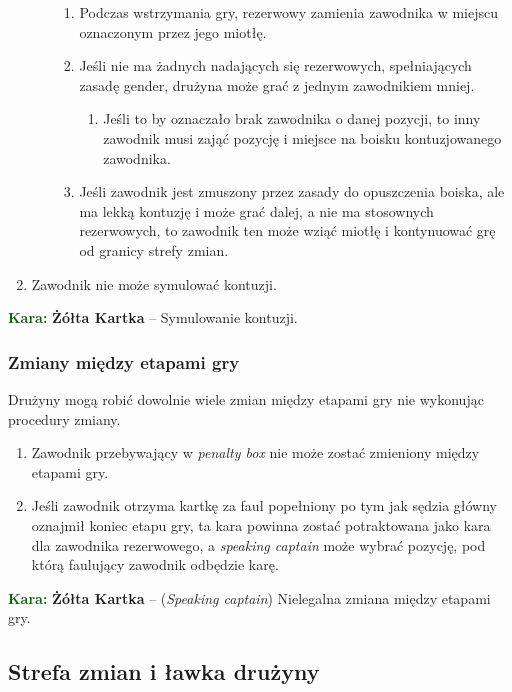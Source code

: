\documentclass[11pt,a4paper]{article}
\newcommand\yellowcard[1]{\bgroup\textcolor{darkgreen}{\textbf{Kara: }}\bgroup\textcolor{darkyellow}{\textbf{Żółta Kartka}} -- #1}
\begin{document}
\begin{enumerate}
\begin{enumerate}
\begin{enumerate}
      \item Podczas wstrzymania gry, rezerwowy zamienia zawodnika w miejscu oznaczonym przez jego miotłę.
      \item Jeśli nie ma żadnych nadających się rezerwowych, spełniających zasadę gender, drużyna może grać z jednym zawodnikiem mniej.
      \begin{enumerate}
        \item Jeśli to by oznaczało brak zawodnika o danej pozycji, to inny zawodnik musi zająć pozycję i miejsce na boisku kontuzjowanego zawodnika.
      \end{enumerate}
      \item Jeśli zawodnik jest zmuszony przez zasady do opuszczenia boiska, ale ma lekką kontuzję i może grać dalej, a nie ma stosownych rezerwowych, to zawodnik ten może wziąć miotłę i kontynuować grę od granicy strefy zmian.
    \end{enumerate}
  \end{enumerate}
  \item Zawodnik nie może symulować kontuzji.
\end{enumerate}

\yellowcard{Symulowanie kontuzji.}

\subsubsection{Zmiany między etapami gry}
Drużyny mogą robić dowolnie wiele zmian między etapami gry nie wykonując procedury zmiany.
\begin{enumerate}
  \item Zawodnik przebywający w \emph{penalty box} nie może zostać zmieniony między etapami gry.
  \item Jeśli zawodnik otrzyma kartkę za faul popełniony po tym jak sędzia główny oznajmił koniec etapu gry, ta kara powinna zostać potraktowana jako kara dla zawodnika rezerwowego, a \emph{speaking captain} może wybrać pozycję, pod którą faulujący zawodnik odbędzie karę.
\end{enumerate}

\yellowcard{(\emph{Speaking captain}) Nielegalna zmiana między etapami gry.}

\subsection{Strefa zmian i ławka drużyny}
\end{document}
